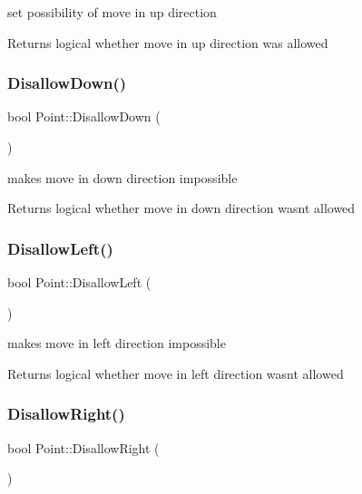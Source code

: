 set possibility of move in up direction 

\begin{DoxyReturn}{Returns}
logical whether move in up direction was allowed 
\end{DoxyReturn}
\mbox{\label{class_point_ab1d92678fc5ba39f65649144a261d6f4}} 
\subsubsection{\texorpdfstring{Disallow\+Down()}{DisallowDown()}}
{\footnotesize\ttfamily bool Point\+::\+Disallow\+Down (\begin{DoxyParamCaption}{ }\end{DoxyParamCaption})}



makes move in down direction impossible 

\begin{DoxyReturn}{Returns}
logical whether move in down direction wasn\textquotesingle{}t allowed 
\end{DoxyReturn}
\mbox{\label{class_point_a9a3dacc41ce29ba4535b99e9d0c6575e}} 
\subsubsection{\texorpdfstring{Disallow\+Left()}{DisallowLeft()}}
{\footnotesize\ttfamily bool Point\+::\+Disallow\+Left (\begin{DoxyParamCaption}{ }\end{DoxyParamCaption})}



makes move in left direction impossible 

\begin{DoxyReturn}{Returns}
logical whether move in left direction wasn\textquotesingle{}t allowed 
\end{DoxyReturn}
\mbox{\label{class_point_a38a55e9eae750c1e3838c1572b1b8ae2}} 
\subsubsection{\texorpdfstring{Disallow\+Right()}{DisallowRight()}}
{\footnotesize\ttfamily bool Point\+::\+Disallow\+Right (\begin{DoxyParamCaption}{ }\end{DoxyParamCaption})}




